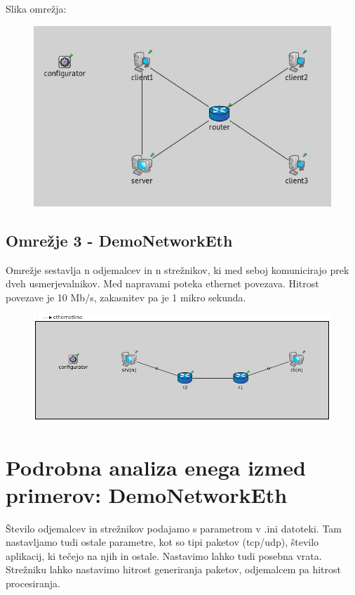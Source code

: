 \documentclass[11pt,a4paper,slovene]{myarticle}
\begin{document}
Slika omrežja:

\begin{figure}[h]
  \includegraphics[width=\linewidth]{ipv6bulktransfer.jpg}
\end{figure}




\subsection{Omrežje 3 - DemoNetworkEth}
Omrežje sestavlja n odjemalcev in n strežnikov, ki med seboj komunicirajo prek dveh usmerjevalnikov.
Med napravami poteka ethernet povezava. Hitrost povezave je 10 Mb/s, zakasnitev pa je 1 mikro sekunda.

\begin{figure}[h]
  \includegraphics[width=\linewidth]{demonetworketh_struct.png}
\end{figure}



\section{Podrobna analiza enega izmed primerov: DemoNetworkEth}

Število odjemalcev in strežnikov podajamo s parametrom v .ini datoteki. Tam nastavljamo tudi ostale parametre, kot so tipi paketov (tcp/udp), število aplikacij, ki tečejo na njih in ostale.
Nastavimo lahko tudi posebna vrata. Strežniku lahko nastavimo hitrost generiranja paketov, odjemalcem pa hitrost procesiranja.
\end{document}
